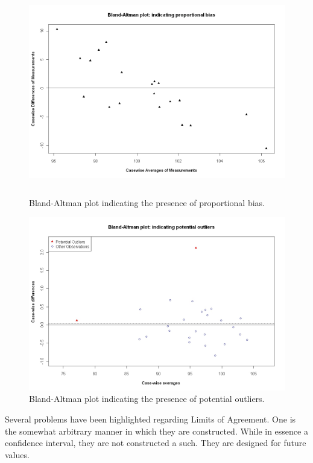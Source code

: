 \documentclass[12pt, a4paper]{report}
\theoremstyle{plain}
\theoremstyle{definition}
\theoremstyle{remark}
\begin{document}
\begin{figure}[h!]
	\begin{center}
		\includegraphics[height=90mm]{images/PropBias.jpeg}
		\caption{Bland-Altman plot indicating the presence of proportional bias.}\label{PropBias}
	\end{center}
\end{figure}

\begin{figure}[h!]
	\begin{center}
		\includegraphics[width=125mm]{images/BAOutliers.jpeg}
		\caption{Bland-Altman plot indicating the presence of potential outliers.}\label{Outliers}
	\end{center}
\end{figure}

Several problems have been highlighted regarding Limits of
Agreement. One is the somewhat arbitrary manner in which they are
constructed. While in essence a confidence interval, they are not
constructed a such. They are designed for future values.
\end{document}
